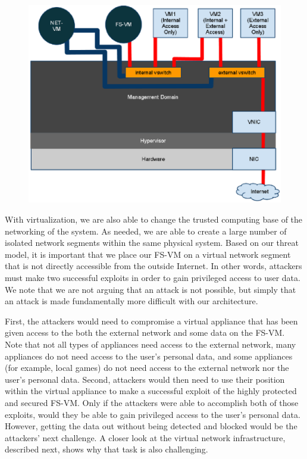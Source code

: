 \begin{figure}[tbp]
\begin{centering}
\label{fig:NetworkArchitectureSimplified}
\includegraphics[scale=0.9,angle=90]{figs/NetworkArchitectureSimplified}
\end{centering} 
\end{figure}


With virtualization, we are also able to change the trusted computing base of the networking of the system. As needed, we are able to create a large number of isolated network segments within the same physical system. Based on our threat model, it is important that we place our FS-VM on a virtual network segment that is not directly accessible from the outside Internet. In other words, attackers must make two successful exploits in order to gain privileged access to user data. We note that we are not arguing that an attack is not possible, but simply that an attack is made fundamentally more difficult with our architecture.

First, the attackers would need to compromise a virtual appliance that has been given access to the both the external network and some data on the FS-VM. Note that not all types of appliances need access to the external network, many appliances do not need access to the user's personal data, and some appliances (for example, local games) do not need access to the external network nor the user's personal data. Second, attackers would then need to use their position within the virtual appliance to make a successful exploit of the highly protected and secured FS-VM. Only if the attackers were able to accomplish both of those exploits, would they be able to gain privileged access to the user's personal data. However, getting the data out without being detected and blocked would be the attackers' next challenge. A closer look at the virtual network infrastructure, described next, shows why that task is also challenging.

